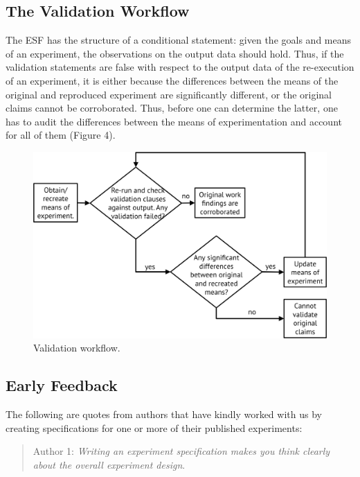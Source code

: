 \documentclass[10pt,reprint]{sigplanconf}
\begin{document}
\subsection{The Validation Workflow}\label{sec:workflow}

The ESF has the structure of a conditional statement: given the goals
and means of an experiment, the observations on the output data should
hold. Thus, if the validation statements are false with respect to the
output data of the re-execution of an experiment, it is either because
the differences between the means of the original and reproduced
experiment are significantly different, or the original claims cannot be
corroborated. Thus, before one can determine the latter, one has to
audit the differences between the means of experimentation and account
for all of them (Figure 4).

\begin{figure}[htbp]
\centering
\includegraphics{figures/workflow.png}
\caption{Validation workflow.}
\end{figure}

\subsection{Early Feedback}\label{early-feedback}

The following are quotes from authors that have kindly worked with us by
creating specifications for one or more of their published experiments:

\begin{quote}
Author 1: \emph{Writing an experiment specification makes you think
clearly about the overall experiment design}.
\end{quote}
\end{document}
